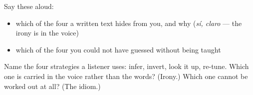 Say these aloud:

\begin{itemize}
\raggedright
  \item which of the four a written text hides from you, and why (\emph{sí, claro} — the irony is in the voice)
  \item which of the four you could not have guessed without being taught
\end{itemize}

\begin{tcolorbox}[breakable,colback=teal!4,colframe=teal!35!black,title={Before you move on}]
Name the four strategies a listener uses: infer, invert, look it up, re-tune. Which one is carried in the voice rather than the words? (Irony.) Which one cannot be worked out at all? (The idiom.)
\end{tcolorbox}

